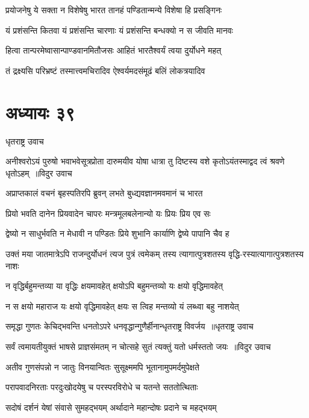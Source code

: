 \twolineshloka
{प्रयोजनेषु ये सक्ता न विशेषेषु भारत}
{तानहं पण्डितान्मन्ये विशेषा हि प्रसङ्गिनः}


\twolineshloka
{यं प्रशंसन्ति कितवा यं प्रशंसन्ति चारणाः}
{यं प्रशंसन्ति बन्धक्यो न स जीवति मानवः}


\twolineshloka
{हित्वा तान्परमेष्वासान्पाण्डवानमितौजसः}
{आहितं भारतैश्वर्यं त्वया दुर्योधने महत्}


\twolineshloka
{तं द्रक्ष्यसि परिभ्रष्टं तस्मात्त्वमचिरादिव}
{ऐश्वर्यमदसंमूढं बलिं लोकत्रयादिव}


\chapter{अध्यायः ३९}
\twolineshloka
{धृतराष्ट्र उवाच}
{}


\threelineshloka
{अनीश्वरोऽयं पुरुषो भवाभवेसूत्रप्रोता दारुमयीव योषा}
{धात्रा तु दिष्टस्य वशे कृतोऽयंतस्माद्वद त्वं श्रवणे धृतोऽहम् ॥विदुर उवाच}
{}


\twolineshloka
{अप्राप्तकालं वचनं बृहस्पतिरपि ब्रुवन्}
{लभते बुध्द्यवज्ञानमवमानं च भारत}


\twolineshloka
{प्रियो भवति दानेन प्रियवादेन चापरः}
{मन्त्रमूलबलेनान्यो यः प्रियः प्रिय एव सः}


\twolineshloka
{द्वेष्यो न साधुर्भवति न मेधावी न पण्डितः}
{प्रिये शुभानि कार्याणि द्वेष्ये पापानि चैव ह}


\twolineshloka
{उक्तं मया जातमात्रेऽपि राजन्दुर्योधनं त्यज पुत्रं त्वमेकम्}
{तस्य त्यागात्पुत्रशतस्य वृद्धि-रस्यात्यागात्पुत्रशतस्य नाशः}


\twolineshloka
{न वृद्धिर्बहुमन्तव्या या वृद्धिः क्षयमावहेत्}
{क्षयोऽपि बहुमन्तव्यो यः क्षयो वृद्धिमावहेत्}


\twolineshloka
{न स क्षयो महाराज यः क्षयो वृद्धिमावहेत्}
{क्षयः स त्विह मन्तव्यो यं लब्ध्वा बहु नाशयेत्}


\threelineshloka
{समृद्धा गुणतः केचिद्भवन्ति धनतोऽपरे}
{धनवृद्धान्गुणैर्हीनान्धृतराष्ट्र विवर्जय ॥धृतराष्ट्र उवाच}
{}


\threelineshloka
{सर्वं त्वमायतीयुक्तं भाषसे प्राज्ञसंमतम्}
{न चोत्सहे सुतं त्यक्तुं यतो धर्मस्ततो जयः ॥विदुर उवाच}
{}


\twolineshloka
{अतीव गुणसंपन्नो न जातुः विनयान्वितः}
{सुसूक्ष्ममपि भूतानामुपमर्दमुपेक्षते}


\twolineshloka
{परापवादनिरताः परदुःखोदयेषु च}
{परस्परविरोधे च यतन्ते सततोत्थिताः}


\twolineshloka
{सदोषं दर्शनं येषां संवासे सुमहद्भयम्}
{अर्थादाने महान्दोषः प्रदाने च महद्भयम्}


